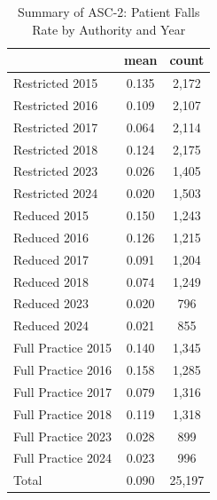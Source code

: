 \begin{table}[htbp]\centering
\def\sym#1{\ifmmode^{#1}\else\(^{#1}\)\fi}
\caption{Summary of ASC-2: Patient Falls Rate by Authority and Year}
\begin{tabular}{l*{1}{cc}}
\toprule
                    &        mean&       count\\
\midrule
Restricted 2015     &       0.135&       2,172\\
Restricted 2016     &       0.109&       2,107\\
Restricted 2017     &       0.064&       2,114\\
Restricted 2018     &       0.124&       2,175\\
Restricted 2023     &       0.026&       1,405\\
Restricted 2024     &       0.020&       1,503\\
Reduced 2015        &       0.150&       1,243\\
Reduced 2016        &       0.126&       1,215\\
Reduced 2017        &       0.091&       1,204\\
Reduced 2018        &       0.074&       1,249\\
Reduced 2023        &       0.020&         796\\
Reduced 2024        &       0.021&         855\\
Full Practice 2015  &       0.140&       1,345\\
Full Practice 2016  &       0.158&       1,285\\
Full Practice 2017  &       0.079&       1,316\\
Full Practice 2018  &       0.119&       1,318\\
Full Practice 2023  &       0.028&         899\\
Full Practice 2024  &       0.023&         996\\
Total               &       0.090&      25,197\\
\bottomrule
\end{tabular}
\end{table}
